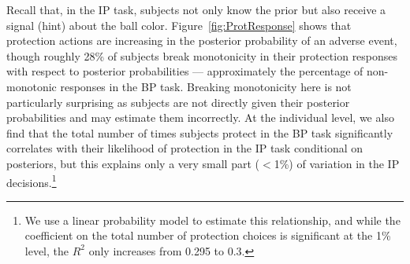 \documentclass[12pt,a4paper]{article}
\begin{document}
Recall that, in the IP task, subjects not only know the prior but also receive a signal (hint) about the ball color. 
Figure~\ref{fig:ProtResponse} shows that protection actions are increasing in the posterior probability of an adverse event, though roughly 28\% of subjects break monotonicity in their protection responses with respect to posterior probabilities --- approximately the percentage of non-monotonic responses in the BP task.  Breaking monotonicity here is not particularly surprising as subjects are not directly given their posterior probabilities and may estimate them incorrectly. At the individual level, we also find that the total number of times subjects protect in the BP task significantly correlates with their likelihood of protection in the IP task conditional on posteriors, but this explains only a very small part ($<$1\%) of variation in the IP decisions.\footnote{We use a linear probability model to estimate this relationship, and while the coefficient on the total number of protection choices is significant at the 1\% level, the $R^2$ only increases from 0.295 to 0.3.} 
\end{document}
